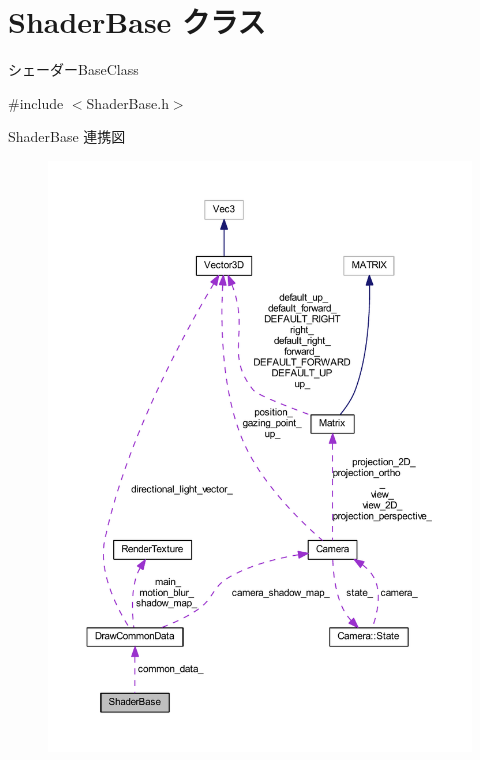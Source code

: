 \hypertarget{class_shader_base}{}\section{Shader\+Base クラス}
\label{class_shader_base}


シェーダー\+Base\+Class  




{\ttfamily \#include $<$Shader\+Base.\+h$>$}



Shader\+Base 連携図\nopagebreak
\begin{figure}[H]
\begin{center}
\leavevmode
\includegraphics[width=350pt]{class_shader_base__coll__graph}
\end{center}
\end{figure}
